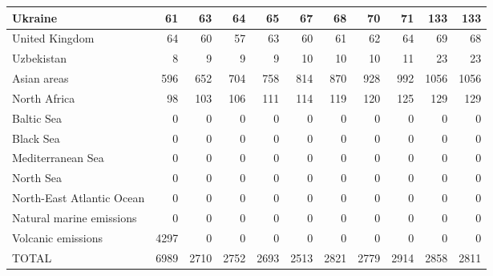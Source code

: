 \begin{table}
\begin{tabular}{|l|r|r|r|r|r|r|r|r|r|r|}
                       Ukraine&     61&     63&     64&     65&     67&     68&     70&     71&    133&    133\\\hline
                United Kingdom&     64&     60&     57&     63&     60&     61&     62&     64&     69&     68\\\hline
                    Uzbekistan&      8&      9&      9&      9&     10&     10&     10&     11&     23&     23\\\hline
                   Asian areas&    596&    652&    704&    758&    814&    870&    928&    992&   1056&   1056\\\hline
                  North Africa&     98&    103&    106&    111&    114&    119&    120&    125&    129&    129\\\hline
                    Baltic Sea&      0&      0&      0&      0&      0&      0&      0&      0&      0&      0\\\hline
                     Black Sea&      0&      0&      0&      0&      0&      0&      0&      0&      0&      0\\\hline
             Mediterranean Sea&      0&      0&      0&      0&      0&      0&      0&      0&      0&      0\\\hline
                     North Sea&      0&      0&      0&      0&      0&      0&      0&      0&      0&      0\\\hline
     North-East Atlantic Ocean&      0&      0&      0&      0&      0&      0&      0&      0&      0&      0\\\hline
      Natural marine emissions&      0&      0&      0&      0&      0&      0&      0&      0&      0&      0\\\hline
            Volcanic emissions&   4297&      0&      0&      0&      0&      0&      0&      0&      0&      0\\\hline\hline
                         TOTAL&   6989&   2710&   2752&   2693&   2513&   2821&   2779&   2914&   2858&   2811\\\hline
 \end{tabular}
 \end{table}
 
\cleardoublepage
